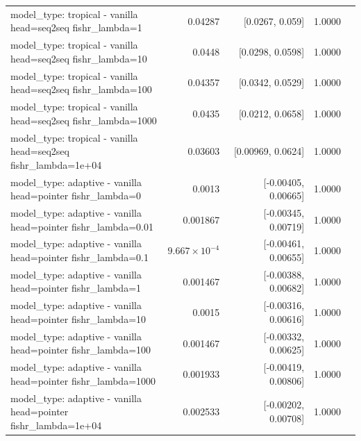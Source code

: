 \documentclass[10pt]{article}
\makeatletter
\newcommand{\stackcell}[1]{\begin{tabular}[t]{@{}l@{}}#1\end{tabular}}
\makeatother
\begin{document}
{\begin{longtable}{lrrrl}
\stackcell{model\_type: tropical - vanilla\\\footnotesize head=seq2seq fishr\_lambda=1 } & 0.04287 & [0.0267, 0.059] & 1.0000 & \\
\stackcell{model\_type: tropical - vanilla\\\footnotesize head=seq2seq fishr\_lambda=10 } & 0.0448 & [0.0298, 0.0598] & 1.0000 & \\
\stackcell{model\_type: tropical - vanilla\\\footnotesize head=seq2seq fishr\_lambda=100 } & 0.04357 & [0.0342, 0.0529] & 1.0000 & \\
\stackcell{model\_type: tropical - vanilla\\\footnotesize head=seq2seq fishr\_lambda=1000 } & 0.0435 & [0.0212, 0.0658] & 1.0000 & \\
\stackcell{model\_type: tropical - vanilla\\\footnotesize head=seq2seq fishr\_lambda=1e+04 } & 0.03603 & [0.00969, 0.0624] & 1.0000 & \\
\stackcell{model\_type: adaptive - vanilla\\\footnotesize head=pointer fishr\_lambda=0 } & 0.0013 & [-0.00405, 0.00665] & 1.0000 & \\
\stackcell{model\_type: adaptive - vanilla\\\footnotesize head=pointer fishr\_lambda=0.01 } & 0.001867 & [-0.00345, 0.00719] & 1.0000 & \\
\stackcell{model\_type: adaptive - vanilla\\\footnotesize head=pointer fishr\_lambda=0.1 } & $9.667\times10^{-4}$ & [-0.00461, 0.00655] & 1.0000 & \\
\stackcell{model\_type: adaptive - vanilla\\\footnotesize head=pointer fishr\_lambda=1 } & 0.001467 & [-0.00388, 0.00682] & 1.0000 & \\
\stackcell{model\_type: adaptive - vanilla\\\footnotesize head=pointer fishr\_lambda=10 } & 0.0015 & [-0.00316, 0.00616] & 1.0000 & \\
\stackcell{model\_type: adaptive - vanilla\\\footnotesize head=pointer fishr\_lambda=100 } & 0.001467 & [-0.00332, 0.00625] & 1.0000 & \\
\stackcell{model\_type: adaptive - vanilla\\\footnotesize head=pointer fishr\_lambda=1000 } & 0.001933 & [-0.00419, 0.00806] & 1.0000 & \\
\stackcell{model\_type: adaptive - vanilla\\\footnotesize head=pointer fishr\_lambda=1e+04 } & 0.002533 & [-0.00202, 0.00708] & 1.0000 & \\

\end{longtable}}
\end{document}
